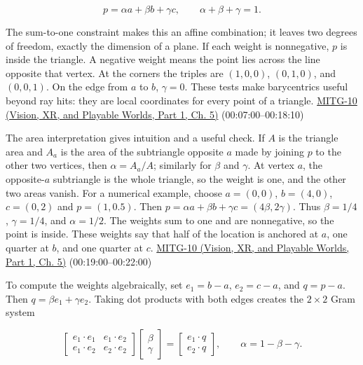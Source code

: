 \[
p=\alpha a+\beta b+\gamma c,\qquad \alpha+\beta+\gamma=1.
\]

The sum-to-one constraint makes this an affine combination; it leaves two degrees of freedom, exactly the dimension of a plane. If each weight is nonnegative, \(p\) is inside the triangle. A negative weight means the point lies across the line opposite that vertex. At the corners the triples are \((1,0,0)\), \((0,1,0)\), and \((0,0,1)\). On the edge from \(a\) to \(b\), \(\gamma=0\). These tests make barycentrics useful beyond ray hits: they are local coordinates for every point of a triangle. \href{../07-Vision-XR-and-Playable-Worlds-P01/main.pdf\#nameddest=04-visual-computing-ii-ch036-mitg-10---ray-casting-ii}{MITG-10 (Vision, XR, and Playable Worlds, Part 1, Ch. 5)} (00:07:00--00:18:10)

The area interpretation gives intuition and a useful check. If \(A\) is the triangle area and \(A_a\) is the area of the subtriangle opposite \(a\) made by joining \(p\) to the other two vertices, then \(\alpha=A_a/A\); similarly for \(\beta\) and \(\gamma\). At vertex \(a\), the opposite-\(a\) subtriangle is the whole triangle, so the weight is one, and the other two areas vanish. For a numerical example, choose \(a=(0,0)\), \(b=(4,0)\), \(c=(0,2)\) and \(p=(1,0.5)\). Then \(p=\alpha a+\beta b+\gamma c=(4\beta,2\gamma)\). Thus \(\beta=1/4\), \(\gamma=1/4\), and \(\alpha=1/2\). The weights sum to one and are nonnegative, so the point is inside. These weights say that half of the location is anchored at \(a\), one quarter at \(b\), and one quarter at \(c\). \href{../07-Vision-XR-and-Playable-Worlds-P01/main.pdf\#nameddest=04-visual-computing-ii-ch036-mitg-10---ray-casting-ii}{MITG-10 (Vision, XR, and Playable Worlds, Part 1, Ch. 5)} (00:19:00--00:22:00)

To compute the weights algebraically, set \(e_1=b-a\), \(e_2=c-a\), and \(q=p-a\). Then \(q=\beta e_1+\gamma e_2\). Taking dot products with both edges creates the \(2\times2\) Gram system

\[
\begin{bmatrix}e_1\cdot e_1&e_1\cdot e_2\\e_1\cdot e_2&e_2\cdot e_2\end{bmatrix}
\begin{bmatrix}\beta\\\gamma\end{bmatrix}=
\begin{bmatrix}e_1\cdot q\\e_2\cdot q\end{bmatrix},\qquad \alpha=1-\beta-\gamma.
\]

